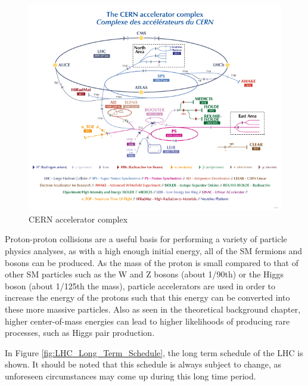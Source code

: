 \begin{figure}[H]
    \centering
    \includegraphics[width=\textwidth]{Images/LHC/CERN_Accelerator_Complex.png}
    \caption{CERN accelerator complex}
    \label{fig:CERN_Acc_Complex}
\end{figure}


Proton-proton collisions are a useful basis for performing a variety of particle physics analyses, as with a high enough initial energy, all of the SM fermions and bosons can be produced. As the mass of the proton is small compared to that of other SM particles such as the W and Z bosons (about 1/90th) or the Higgs boson (about 1/125th the mass), particle accelerators are used in order to increase the energy of the protons such that this energy can be converted into these more massive particles. Also as seen in the theoretical background chapter, higher center-of-mass energies can lead to higher likelihoods of producing rare processes, such as Higgs pair production. 

In Figure \ref{fig:LHC_Long_Term_Schedule}, the long term schedule of the LHC is shown. It should be noted that this schedule is always subject to change, as unforeseen circumstances may come up during this long time period.


